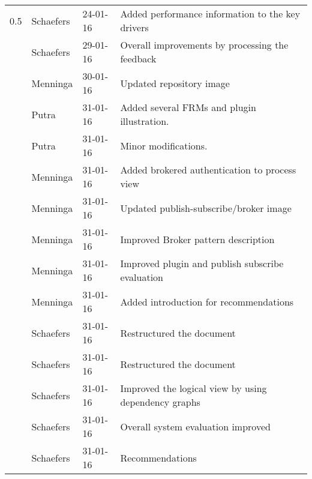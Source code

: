 \begin{longtable}{L{} L{} L{} L{}}
				0.5 & Schaefers & 24-01-16 & Added performance information to the key drivers \\
					& Schaefers & 29-01-16 & Overall improvements by processing the feedback \\
					& Menninga  & 30-01-16 & Updated repository image\\
					& Putra		& 31-01-16 & Added several FRMs and plugin illustration. \\
					& Putra		& 31-01-16 & Minor modifications. \\
					& Menninga  & 31-01-16 & Added brokered authentication to process view \\
					& Menninga  & 31-01-16 & Updated publish-subscribe/broker image \\
					& Menninga  & 31-01-16 & Improved Broker pattern description \\
					& Menninga  & 31-01-16 & Improved plugin and publish subscribe evaluation\\
					& Menninga  & 31-01-16 & Added introduction for recommendations \\
					& Schaefers & 31-01-16 & Restructured the document \\
					& Schaefers & 31-01-16 & Restructured the document \\
					& Schaefers & 31-01-16 & Improved the logical view by using dependency graphs \\
					& Schaefers & 31-01-16 & Overall system evaluation improved \\
					& Schaefers & 31-01-16 & Recommendations \\					
				\midrule

\end{longtable}